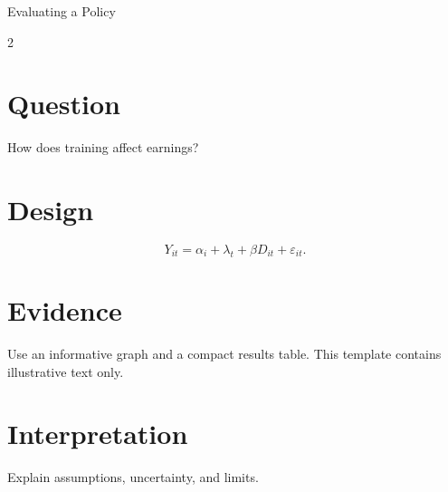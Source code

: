 \documentclass{article}
\begin{document}
\begin{center}{\Huge Evaluating a Policy}\par{}\end{center}
\begin{multicols}{2}
\section*{Question}How does training affect earnings?
\section*{Design}\[Y_{it}=\alpha_i+\lambda_t+\beta D_{it}+\varepsilon_{it}.\]
\section*{Evidence}Use an informative graph and a compact results table. This template contains illustrative text only.
\section*{Interpretation}Explain assumptions, uncertainty, and limits.
\end{multicols}
\end{document}

